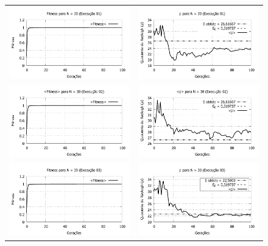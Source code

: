 \begin{figure}[phtb]
\centering
  \begin{tabular}{@{}cc@{}}
    \includegraphics[width=.40\textwidth]{figs/resultados/fitnessGrad/N30_01_fitness.pdf} &
    \includegraphics[width=.40\textwidth]{figs/resultados/fitnessGrad/N30_01_rho.pdf}   \\
		\includegraphics[width=.40\textwidth]{figs/resultados/fitnessGrad/N30_02_fitness.pdf} &
    \includegraphics[width=.40\textwidth]{figs/resultados/fitnessGrad/N30_02_rho.pdf}   \\
		\includegraphics[width=.40\textwidth]{figs/resultados/fitnessGrad/N30_03_fitness.pdf} &
    \includegraphics[width=.40\textwidth]{figs/resultados/fitnessGrad/N30_03_rho.pdf}   \\

\end{tabular}
\end{figure}
